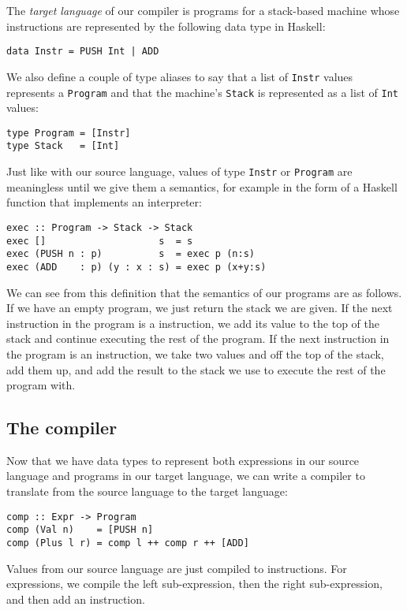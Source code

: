 The \emph{target language} of our compiler is programs for a stack-based machine whose instructions are represented by the following data type in Haskell: 
\begin{verbatim}
data Instr = PUSH Int | ADD 
\end{verbatim}
We also define a couple of type aliases to say that a list of \texttt{\small Instr} values represents a \texttt{\small Program} and that the machine's \texttt{\small Stack} is represented as a list of \texttt{\small Int} values:
\begin{verbatim}
type Program = [Instr]
type Stack   = [Int]
\end{verbatim}
Just like with our source language, values of type \texttt{\small Instr} or \texttt{\small Program} are meaningless until we give them a semantics, for example in the form of a Haskell function that implements an interpreter:
\begin{verbatim}
exec :: Program -> Stack -> Stack 
exec []                    s  = s 
exec (PUSH n : p)          s  = exec p (n:s)
exec (ADD    : p) (y : x : s) = exec p (x+y:s)
\end{verbatim}
We can see from this definition that the semantics of our programs are as follows. If we have an empty program, we just return the stack we are given. If the next instruction in the program is a  instruction, we add its value to the top of the stack and continue executing the rest of the program. If the next instruction in the program is an  instruction, we take two values  and  off the top of the stack, add them up, and add the result to the stack we use to execute the rest of the program with.

\subsection{The compiler}

Now that we have data types to represent both expressions in our source language and programs in our target language, we can write a compiler to translate from the source language to the target language:
\begin{verbatim}
comp :: Expr -> Program 
comp (Val n)    = [PUSH n]
comp (Plus l r) = comp l ++ comp r ++ [ADD]
\end{verbatim}
Values from our source language are just compiled to  instructions. For  expressions, we compile the left sub-expression, then the right sub-expression, and then add an  instruction.

